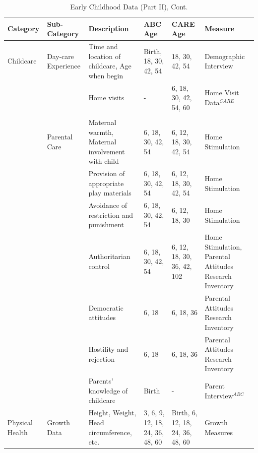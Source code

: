\documentclass[static]{JJH-Beamer}
\begin{document}
\begin{frame}[shrink=5]

\begin{table}[H]
\addtocounter{table}{-1}
\caption{Early Childhood Data (Part II), Cont.}
\begin{center}
\begin{tiny}
\begin{tabular}{L{1.1cm} C{1.8cm} C{2.2cm} C{1.3cm} C{1.3cm}  C{2cm}}
\toprule
\textbf{Category}	&	\textbf{Sub-Category}	&	\textbf{Description}	&	\textbf{ABC Age}  	&  \textbf{CARE Age}  & 	\textbf{Measure}	\\ \midrule
Childcare	&	Day-care Experience	&	Time and location of childcare, Age when begin	&	Birth, 18, 30, 42, 54	&	18, 30, 42, 54	&	Demographic Interview	\\
			&						& 	Home visits &	-	&	6, 18, 30, 42, 54, 60	& Home Visit Data$^{CARE}$ \\
	&	\\
	&	Parental Care	&	Maternal warmth, Maternal involvement with child	&	6, 18, 30, 42, 54	&	6, 12, 18, 30, 42, 54	&	Home Stimulation	\\
	&		&	Provision of appropriate play materials	&	6, 18, 30, 42, 54	&	 6, 12, 18, 30, 42, 54	&	Home Stimulation	\\
	&		&	Avoidance of restriction and punishment	&	6, 18, 30, 42, 54	&	6, 12, 18, 30		&	Home Stimulation	\\
	&		&	Authoritarian control	&	6, 18, 30, 42, 54	&	6, 12, 18, 30, 36, 42, 102		&	Home Stimulation, Parental Attitudes Research Inventory	\\
	&		&	Democratic attitudes	&	6, 18	&	6, 18, 36	&	Parental Attitudes Research Inventory	\\
	&		&	Hostility and rejection	&	6, 18	&	6, 18, 36	&	Parental Attitudes Research Inventory	\\
	&		&	Parents' knowledge of childcare	&	Birth	&	-	&	Parent Interview$^{ABC}$	\\ \midrule
Physical Health	&	Growth Data	&	Height, Weight, Head circumference, etc.	&	3, 6, 9, 12, 18, 24, 36, 48, 60	&	Birth, 6, 12, 18, 24, 36, 48, 60	&	Growth Measures	\\
\bottomrule
\end{tabular}
\end{tiny}
\end{center}
\end{table}

\end{frame}
\end{document}
